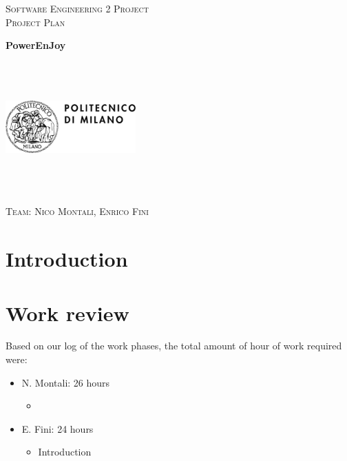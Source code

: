 \documentclass[a4paper,12pt,oneside]{book}
\begin{document}
	
	\pagestyle{empty}\centering
	\textsc{\Large Software Engineering 2 Project\\}
	\textsc{Project Plan}

	\vfill

	\textbf{\Huge PowerEnJoy}
	
	\vfill
	\begin{center}	
	\includegraphics[width=5cm,height=5cm,keepaspectratio]{polimi}
	\end{center}
	\textsc{\Large Team: Nico Montali, Enrico Fini}
	
	{\hypersetup{linkcolor=black}
		\tableofcontents
	}
	
	\clearpage
	

	\begin{flushleft}
	\chapter{Introduction}\label{cap:Intro}
	
	\chapter{Work review}
	Based on our log of the work phases, the total amount of hour of work required were:
	\begin{itemize}
	\item N. Montali: 26 hours \begin{itemize}
		\item 
	\end{itemize}
	\item E. Fini: 24 hours\begin{itemize}
		\item Introduction
	\end{itemize}
	\end{itemize}
	\end{flushleft}
\end{document}
